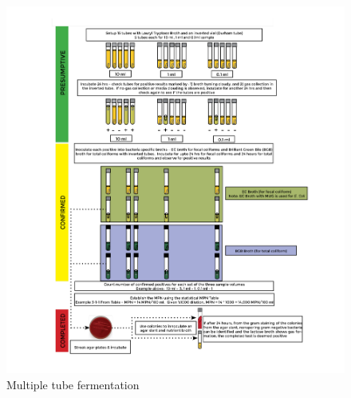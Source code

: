\begin{figure}[H]
\begin{center}
\includegraphics[scale=0.25]{WaterMTF}
\caption{Multiple tube fermentation}
\end{center}
\end{figure}
\thispagestyle{empty}



\newpage

